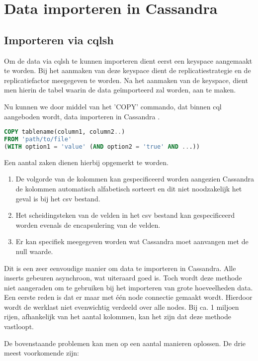\chapter{Data importeren in Cassandra}
\label{ch:cassandra_import}

\section{Importeren via cqlsh}
Om de data via cqlsh te kunnen importeren dient eerst een keyspace aangemaakt te worden.
Bij het aanmaken van deze keyspace dient de replicatiestrategie en de replicatiefactor meegegeven te worden.
Na het aanmaken van de keyspace, dient men hierin de tabel waarin de data geïmporteerd zal worden, aan te maken.

Nu kunnen we door middel van het 'COPY' commando, dat binnen cql aangeboden wordt, data importeren in Cassandra \citep{Cannon2012Import}.

\begin{lstlisting}[language=SQL, breaklines=true]
COPY tablename(column1, column2..)
FROM 'path/to/file'
(WITH option1 = 'value' (AND option2 = 'true' AND ...))
\end{lstlisting}

Een aantal zaken dienen hierbij opgemerkt te worden.

\begin{enumerate}
	\item De volgorde van de kolommen kan gespecificeerd worden aangezien Cassandra de kolommen automatisch alfabetisch sorteert en dit niet noodzakelijk het geval is bij het csv bestand.
	\item Het scheidingsteken van de velden in het csv bestand kan gespecificeerd worden evenals de encapsulering van de velden.
	\item Er kan specifiek meegegeven worden wat Cassandra moet aanvangen met de null waarde.
\end{enumerate}

Dit is een zeer eenvoudige manier om data te importeren in Cassandra.
Alle inserts gebeuren asynchroon, wat uiteraard goed is.
Toch wordt deze methode niet aangeraden om te gebruiken bij het importeren van grote hoeveelheden data.
Een eerste reden is dat er maar met één node connectie gemaakt wordt.
Hierdoor wordt de werklast niet evenwichtig verdeeld over alle nodes.
Bij ca. 1 miljoen rijen, afhankelijk van het aantal kolommen, kan het zijn dat deze methode vastloopt.

De bovenstaande problemen kan men op een aantal manieren oplossen.
De drie meest voorkomende zijn:

